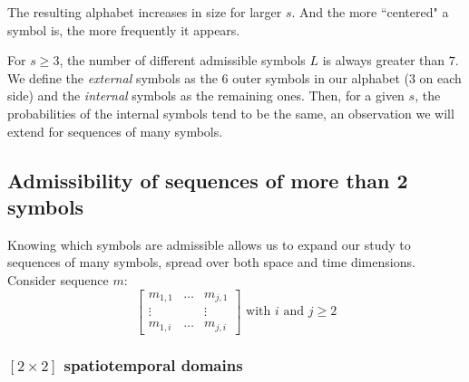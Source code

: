 The resulting alphabet increases in size for larger $s$. And the more
``centered" a symbol is, the more frequently it appears.

For $s \geqslant 3$, the number of different admissible symbols $L$ is
always greater than $7$. We define the \textit{external} symbols as the
$6$ outer symbols in our alphabet ($3$ on each side) and the
\textit{internal} symbols as the remaining ones. Then, for a given $s$,
the probabilities of the internal symbols tend to be the same, an
observation we will extend for sequences of many symbols.


\subsection{Admissibility of sequences of more than 2 symbols}

Knowing which symbols are admissible allows us to expand our study to
sequences of many symbols, spread over both space and time
dimensions. Consider sequence $m$:
\[
\left [
\begin{array}{ccc}
m_{1,1} & \dots & m_{j,1} \\
\vdots & \: & \vdots \\
m_{1,i} & \dots & m_{j,i}
\end{array}
\right ]
\text{ with } i \text{ and } j \geqslant 2
\]

\subsubsection{$[2\!\times\!2]$ spatiotemporal domains}

